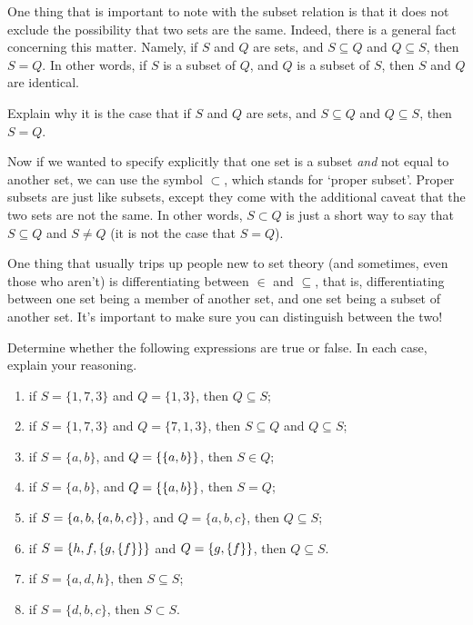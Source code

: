 One thing that is important to note with the subset relation is that it does not exclude the possibility that two sets are the same. Indeed, there is a general fact concerning this matter. Namely, if $S$ and $Q$ are sets, and $S \subseteq Q$ and $Q \subseteq S$, then $S=Q$. In other words, if $S$ is a subset of $Q$, and $Q$ is a subset of $S$, then $S$ and $Q$ are identical. 

\begin{exc}
Explain why it is the case that if $S$ and $Q$ are sets, and $S \subseteq Q$ and $Q \subseteq S$, then $S=Q$.
\end{exc}

Now if we wanted to specify explicitly that one set is a subset \textit{and} not equal to another set, we can use the symbol $\subset$, which stands for `proper subset'. Proper subsets are just like subsets, except they come with the additional caveat that the two sets are not the same. In other words, $S \subset Q$ is just a short way to say that $S \subseteq Q$ and $S \neq Q$ (it is not the case that $S = Q$). 

One thing that usually trips up people new to set theory (and sometimes, even those who aren't) is differentiating between $\in$ and $\subseteq$, that is, differentiating between one set being a member of another set, and one set being a subset of another set. It's important to make sure you can distinguish between the two!

\begin{exc}
Determine whether the following expressions are true or false. In each case, explain your reasoning. 

\begin{enumerate}
	\item if $S=\{1, 7, 3\}$ and $Q=\{1, 3\}$, then $Q \subseteq S$;
	\item if $S=\{1, 7, 3\}$ and $Q=\{7, 1, 3\}$, then $S \subseteq Q$ and $Q \subseteq S$;
	\item if $S=\{a, b\}$, and $Q=\{\{a, b\}\}$, then $S \in Q$;
	\item if $S=\{a, b\}$, and $Q=\{\{a, b\}\}$, then $S = Q$;
	\item if $S=\{a, b, \{a, b, c\}\}$, and $Q=\{a, b, c\}$, then $Q \subseteq S$;
	\item if $S=\{h, f, \{g,\{f\}\}\}$ and $Q=\{g, \{f\}\}$, then $Q \subseteq S$. 
	\item if $S=\{a, d, h\}$, then $S \subseteq S$;
	\item if $S=\{d, b, c\}$, then $S \subset S$.
\end{enumerate}
\end{exc}

